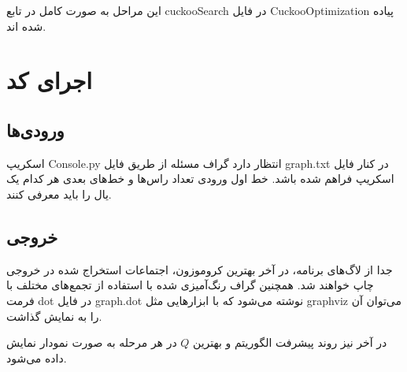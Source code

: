 \documentclass{article}
\begin{document}
این مراحل به صورت کامل در تابع cuckooSearch در فایل CuckooOptimization پیاده شده اند.

\section*{اجرای کد}

\subsection*{ورودی‌ها}
اسکریپ Console.py انتظار دارد گراف مسئله از طریق فایل graph.txt در کنار فایل اسکریپ فراهم شده باشد. خط اول ورودی تعداد راس‌ها و خط‌های بعدی هر کدام یک یال را باید معرفی کنند.

\subsection*{خروجی}
جدا از لاگ‌های برنامه‌، در آخر بهترین کروموزون‌، اجتماعات استخراج شده در خروجی چاپ خواهند شد. همچنین گراف رنگ‌آمیزی شده با استفاده از تجمع‌های مختلف با فرمت dot در فایل graph.dot نوشته می‌شود که با ابزار‌هایی مثل graphviz می‌توان آن را به نمایش گذاشت.

در آخر نیز روند پیشرفت الگوریتم و بهترین $Q$ در هر مرحله به صورت نمودار نمایش داده می‌شود.
\end{document}
